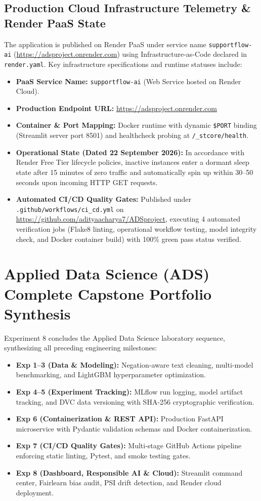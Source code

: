 \documentclass[11pt, a4paper]{article}
\begin{document}
\subsection{Production Cloud Infrastructure Telemetry \& Render PaaS State}
The application is published on Render PaaS under service name \texttt{supportflow-ai} (\url{https://adsproject.onrender.com}) using Infrastructure-as-Code declared in \texttt{render.yaml}. Key infrastructure specifications and runtime statuses include:
\begin{itemize}[leftmargin=1.5em]
    \item \textbf{PaaS Service Name:} \texttt{supportflow-ai} (Web Service hosted on Render Cloud).
    \item \textbf{Production Endpoint URL:} \url{https://adsproject.onrender.com}
    \item \textbf{Container \& Port Mapping:} Docker runtime with dynamic \texttt{\$PORT} binding (Streamlit server port 8501) and healthcheck probing at \texttt{/\_stcore/health}.
    \item \textbf{Operational State (Dated 22 September 2026):} In accordance with Render Free Tier lifecycle policies, inactive instances enter a dormant sleep state after 15 minutes of zero traffic and automatically spin up within 30--50 seconds upon incoming HTTP GET requests.
    \item \textbf{Automated CI/CD Quality Gates:} Published under \texttt{.github/workflows/ci_cd.yml} on \url{https://github.com/adityaacharya7/ADSproject}, executing 4 automated verification jobs (Flake8 linting, operational workflow testing, model integrity check, and Docker container build) with 100\% green pass status verified.
\end{itemize}

\section{Applied Data Science (ADS) Complete Capstone Portfolio Synthesis}
Experiment 8 concludes the Applied Data Science laboratory sequence, synthesizing all preceding engineering milestones:
\begin{itemize}[leftmargin=1.5em]
    \item \textbf{Exp 1--3 (Data \& Modeling):} Negation-aware text cleaning, multi-model benchmarking, and LightGBM hyperparameter optimization.
    \item \textbf{Exp 4--5 (Experiment Tracking):} MLflow run logging, model artifact tracking, and DVC data versioning with SHA-256 cryptographic verification.
    \item \textbf{Exp 6 (Containerization \& REST API):} Production FastAPI microservice with Pydantic validation schemas and Docker containerization.
    \item \textbf{Exp 7 (CI/CD Quality Gates):} Multi-stage GitHub Actions pipeline enforcing static linting, Pytest, and smoke testing gates.
    \item \textbf{Exp 8 (Dashboard, Responsible AI \& Cloud):} Streamlit command center, Fairlearn bias audit, PSI drift detection, and Render cloud deployment.
\end{itemize}
\end{document}
